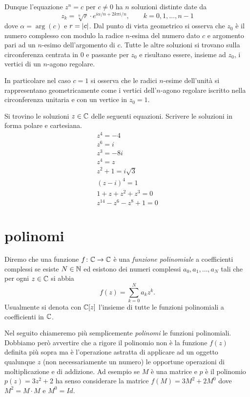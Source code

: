 Dunque l'equazione $z^n = c$ per $c\neq 0$ ha $n$ soluzioni distinte date
da
\[
z_k = \sqrt[n]{r} \cdot e^{i\alpha/n + 2k\pi i /n},
\qquad k=0,1, \dots, n-1
\]
dove $\alpha = \arg(c)$ e $r = {\left|c\right|}$.
Dal punto di vista geometrico si osserva che
$z_0$ è il numero complesso con modulo la radice $n$-esima del numero
dato $c$ e argomento pari ad un $n$-esimo dell'argomento di $c$.
Tutte le altre soluzioni si trovano sulla circonferenza centrata in $0$
e passante per $z_0$ e risultano essere, insieme ad $z_0$, i vertici
di un $n$-agono regolare.

In particolare nel caso $c=1$ si osserva che le radici $n$-esime dell'unità
si rappresentano geometricamente come i vertici dell'$n$-agono regolare iscritto
nella circonferenza unitaria e con un vertice in $z_0=1$.

\begin{exercise}
Si trovino le soluzioni $z \in \mathbb C$ delle seguenti equazioni.
Scrivere le soluzioni in forma polare e cartesiana.
\begin{gather*}
   z^4 = -4 \\
   z^6 = i\\
   z^3 = -8i \\
   z^4 = z\\
   z^2 + 1 = i\sqrt{3} \\
   (z-i)^4 = 1\\
   1 + z + z^2 + z^3 = 0\\
   z^{14} - z^6 - z^8 + 1 = 0
\end{gather*}
\end{exercise}

\section{polinomi}

\begin{definition}
Diremo che una funzione $f\colon \mathbb C \to \mathbb C$ è una
\emph{funzione polinomiale}
%
%
%
a coefficienti complessi se esiste $N\in \mathbb N$ ed esistono dei numeri complessi $a_0, a_1, \dots, a_N$ tali che per ogni $z\in \mathbb C$ si abbia
\[
  f(z) = \sum_{k=0}^N a_k z^k.
\]
Usualmente si denota con $\mathbb C[z]$
l'insieme di tutte le funzioni polinomiali a coefficienti in $\mathbb C$. \end{definition}

Nel seguito chiameremo più semplicemente \emph{polinomi} le funzioni polinomiali. Dobbiamo però avvertire che a rigore il polinomio non è la funzione $f(z)$ definita più sopra ma è l'operazione astratta di applicare ad un oggetto qualunque $z$ (non necessariamente un numero) le opportune operazioni di moltiplicazione e di addizione. Ad esempio se $M$ è una matrice e $p$ è il polinomio $p(z) = 3 z^2+2$ ha senso considerare la matrice $f(M) = 3 M^2 + 2 M^0$ dove $M^2= M\cdot M$ e $M^0 = Id$.

